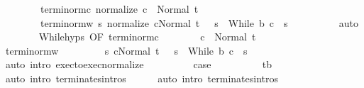 \begin{isabellebody}
\ \ \ \ \ \ \ \ termi{\isacharunderscore}norm{\isacharunderscore}c{\isacharcolon}\ {\isachardoublequoteopen}{\isasymGamma}{\isasymturnstile}normalize\ c\ {\isasymdown}\ Normal\ t{\isacharprime}{\isachardoublequoteclose}\ \isanewline
\ \ \ \ \ \ \ \ termi{\isacharunderscore}norm{\isacharunderscore}w{\isacharprime}{\isacharcolon}\ {\isachardoublequoteopen}{\isasymforall}s{\isacharprime}{\isachardot}\ {\isasymGamma}{\isasymturnstile}{\isasymlangle}normalize\ c{\isacharcomma}Normal\ t{\isacharprime}\ {\isasymrangle}\ {\isasymRightarrow}\ s{\isacharprime}\ {\isasymlongrightarrow}\ {\isasymGamma}{\isasymturnstile}While\ b\ c\ {\isasymdown}\ s{\isacharprime}{\isachardoublequoteclose}\isanewline
\ \ \ \ \ \ \ \ \isamarkupfalse%
\ auto\isanewline
\ \ \ \ \ \ \isamarkupfalse%
\ While{\isachardot}hyps\ {\isacharbrackleft}OF\ termi{\isacharunderscore}norm{\isacharunderscore}c{\isacharbrackright}\isanewline
\ \ \ \ \ \ \isamarkupfalse%
\ {\isachardoublequoteopen}{\isasymGamma}{\isasymturnstile}c\ {\isasymdown}\ Normal\ t{\isacharprime}{\isachardoublequoteclose}\isacommand{{\isachardot}}\isamarkupfalse%
\isanewline
\ \ \ \ \ \ \isamarkupfalse%
\isanewline
\ \ \ \ \ \ \isamarkupfalse%
\ termi{\isacharunderscore}norm{\isacharunderscore}w{\isacharprime}\ \isanewline
\ \ \ \ \ \ \isamarkupfalse%
\ {\isachardoublequoteopen}{\isasymforall}s{\isacharprime}{\isachardot}\ {\isasymGamma}{\isasymturnstile}{\isasymlangle}c{\isacharcomma}Normal\ t{\isacharprime}\ {\isasymrangle}\ {\isasymRightarrow}\ s{\isacharprime}\ {\isasymlongrightarrow}\ {\isasymGamma}{\isasymturnstile}While\ b\ c\ {\isasymdown}\ s{\isacharprime}{\isachardoublequoteclose}\isanewline
\ \ \ \ \ \ \ \ \isamarkupfalse%
\ {\isacharparenleft}auto\ intro{\isacharcolon}\ exec{\isacharunderscore}to{\isacharunderscore}exec{\isacharunderscore}normalize{\isacharparenright}\isanewline
\ \ \ \ \ \ \isamarkupfalse%
\ \isamarkupfalse%
\ {\isacharquery}case\isanewline
\ \ \ \ \ \ \ \ \isamarkupfalse%
\ t{\isacharprime}{\isacharunderscore}b\isanewline
\ \ \ \ \ \ \ \ \isamarkupfalse%
\ {\isacharparenleft}auto\ intro{\isacharcolon}\ terminates{\isachardot}intros{\isacharparenright}\isanewline
\ \ \ \ \isamarkupfalse%
\ {\isacharparenleft}auto\ intro{\isacharcolon}\ terminates{\isachardot}intros{\isacharparenright}\isanewline
\ \ \isacommand{{\isacharbraceright}}\isamarkupfalse%
\isanewline
\ \ \isamarkupfalse%

\end{isabellebody}
